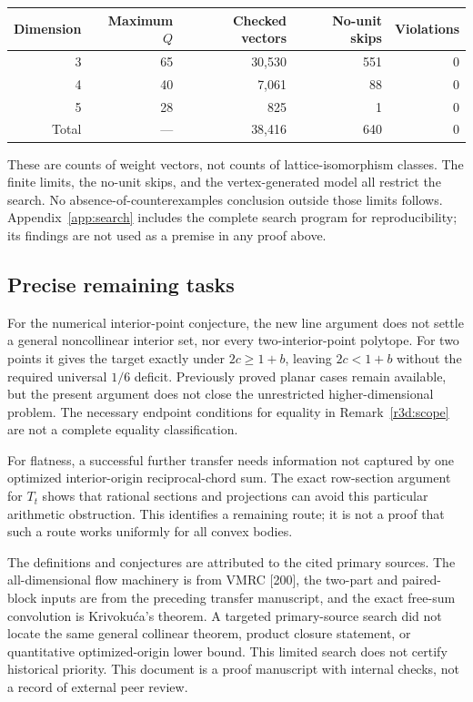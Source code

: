 \documentclass[11pt,a4paper]{article}
\theoremstyle{remark}\newtheorem{remark}[theorem]{Remark}
\begin{document}
\begin{center}
\begin{tabular}{rrrrr}
\toprule
Dimension & Maximum $Q$ & Checked vectors & No-unit skips & Violations\\
\midrule
3 & 65 & 30,530 & 551 & 0\\
4 & 40 & 7,061 & 88 & 0\\
5 & 28 & 825 & 1 & 0\\
\midrule
Total & --- & 38,416 & 640 & 0\\
\bottomrule
\end{tabular}
\end{center}

These are counts of weight vectors, not counts of lattice-isomorphism
classes. The finite limits, the no-unit skips, and the vertex-generated
model all restrict the search. No absence-of-counterexamples conclusion
outside those limits follows. Appendix~\ref{app:search} includes the
complete search program for reproducibility; its findings are not used
as a premise in any proof above.

\subsection{Precise remaining tasks}

For the numerical interior-point conjecture, the new line argument
does not settle a general noncollinear interior set, nor every
two-interior-point polytope. For two points it gives the target exactly
under $2c\ge1+b$, leaving $2c<1+b$ without the required universal
$1/6$ deficit. Previously proved planar cases remain available, but
the present argument does not close the unrestricted higher-dimensional
problem. The necessary endpoint conditions for equality in
Remark~\ref{r3d:scope} are not a complete equality classification.

For flatness, a successful further transfer needs information not
captured by one optimized interior-origin reciprocal-chord sum.
The exact row-section argument for $T_t$ shows that rational sections
and projections can avoid this particular arithmetic obstruction.
This identifies a remaining route; it is not a proof that such a route
works uniformly for all convex bodies.

The definitions and conjectures are attributed to the cited primary
sources. The all-dimensional flow machinery is from VMRC [200], the
two-part and paired-block inputs are from the preceding transfer
manuscript, and the exact free-sum convolution is Krivoku\'ca's theorem.
A targeted primary-source search did not locate the same general
collinear theorem, product closure statement, or quantitative
optimized-origin lower bound. This limited search does not certify
historical priority. This document is a proof manuscript with internal
checks, not a record of external peer review.
\end{document}
